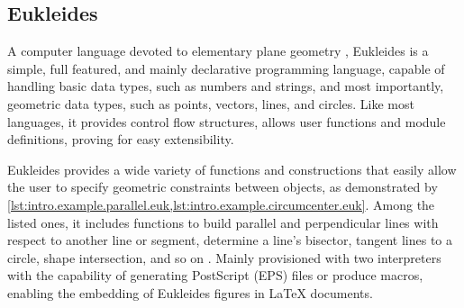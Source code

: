{\color{cyan}

}

\subsection{Eukleides}
\label{sec:related.constraints.eukleides}

A computer language devoted to elementary plane geometry \cite{Obrecht:2010:EM},
Eukleides is a simple, full featured, and mainly declarative programming
language, capable of handling basic data types, such as numbers and strings, and
most importantly, geometric data types, such as points, vectors, lines, and
circles.  Like most languages, it provides control flow structures, allows user
functions and module definitions, proving for easy extensibility.

Eukleides provides a wide variety of functions and constructions that easily
allow the user to specify geometric constraints between objects, as demonstrated
by \cref{lst:intro.example.parallel.euk,lst:intro.example.circumcenter.euk}.
Among the listed ones, it includes functions to build parallel and perpendicular
lines with respect to another line or segment, determine a line's bisector,
tangent lines to a circle, shape intersection, and so on \cite{Obrecht:2010:EM}.
Mainly provisioned with two interpreters with the capability of generating
PostScript (EPS) files or produce macros, enabling the embedding of Eukleides
figures in \LaTeX{} documents.

